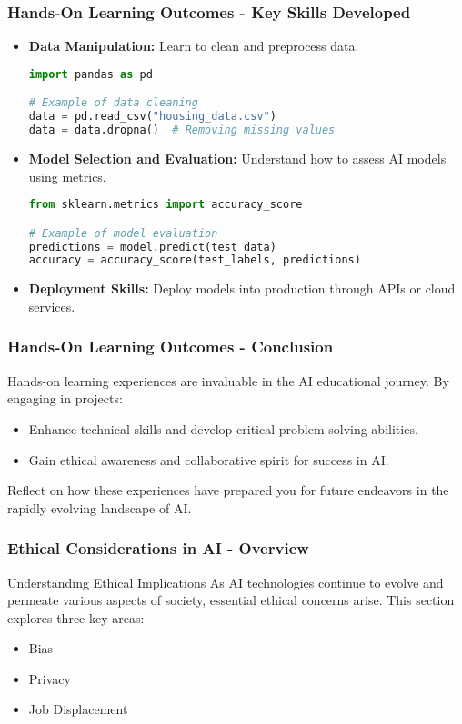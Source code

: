 \documentclass[aspectratio=169]{beamer}
\begin{document}
\begin{frame}[fragile]
    \frametitle{Hands-On Learning Outcomes - Key Skills Developed}
    \begin{itemize}
        \item \textbf{Data Manipulation:} Learn to clean and preprocess data.
            \begin{lstlisting}[language=Python]
import pandas as pd

# Example of data cleaning
data = pd.read_csv("housing_data.csv")
data = data.dropna()  # Removing missing values
            \end{lstlisting}
        
        \item \textbf{Model Selection and Evaluation:} Understand how to assess AI models using metrics.
            \begin{lstlisting}[language=Python]
from sklearn.metrics import accuracy_score

# Example of model evaluation
predictions = model.predict(test_data)
accuracy = accuracy_score(test_labels, predictions)
            \end{lstlisting}
            
        \item \textbf{Deployment Skills:} Deploy models into production through APIs or cloud services.
    \end{itemize}
\end{frame}

\begin{frame}[fragile]
    \frametitle{Hands-On Learning Outcomes - Conclusion}
    Hands-on learning experiences are invaluable in the AI educational journey. By engaging in projects:
    \begin{itemize}
        \item Enhance technical skills and develop critical problem-solving abilities.
        \item Gain ethical awareness and collaborative spirit for success in AI.
    \end{itemize}
    Reflect on how these experiences have prepared you for future endeavors in the rapidly evolving landscape of AI.
\end{frame}

\begin{frame}[fragile]
    \frametitle{Ethical Considerations in AI - Overview}
    \begin{block}{Understanding Ethical Implications}
        As AI technologies continue to evolve and permeate various aspects of society, essential ethical concerns arise. This section explores three key areas: 
        \begin{itemize}
            \item Bias
            \item Privacy
            \item Job Displacement
        \end{itemize}
    \end{block}
\end{frame}
\end{document}
